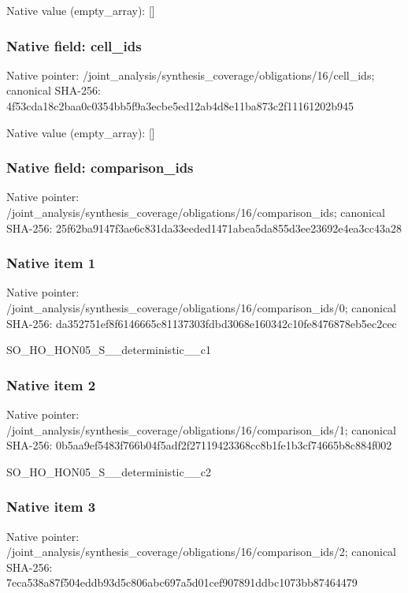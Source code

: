 \documentclass[10pt,a4paper]{article}
\begin{document}
Native value (empty\_\allowbreak{}array): []

\subsubsection{Native field: cell\_\allowbreak{}ids}
Native pointer: /joint\_\allowbreak{}analysis/synthesis\_\allowbreak{}coverage/obligations/16/cell\_\allowbreak{}ids; canonical SHA-256: 4f53cda18c2baa0c0354bb5f9a3ecbe5ed12ab4d8e11ba873c2f11161202b945

Native value (empty\_\allowbreak{}array): []

\subsubsection{Native field: comparison\_\allowbreak{}ids}
Native pointer: /joint\_\allowbreak{}analysis/synthesis\_\allowbreak{}coverage/obligations/16/comparison\_\allowbreak{}ids; canonical SHA-256: 25f62ba9147f3ae6c831da33eeded1471abea5da855d3ee23692e4ea3cc43a28

\subsubsection{Native item 1}
Native pointer: /joint\_\allowbreak{}analysis/synthesis\_\allowbreak{}coverage/obligations/16/comparison\_\allowbreak{}ids/0; canonical SHA-256: da352751ef8f6146665c81137303fdbd3068e160342c10fe8476878eb5ec2cec

\begingroup\raggedright\sloppy SO\_\allowbreak{}HO\_\allowbreak{}HON05\_\allowbreak{}S\_\allowbreak{}\_\allowbreak{}deterministic\_\allowbreak{}\_\allowbreak{}c1\par\endgroup

\subsubsection{Native item 2}
Native pointer: /joint\_\allowbreak{}analysis/synthesis\_\allowbreak{}coverage/obligations/16/comparison\_\allowbreak{}ids/1; canonical SHA-256: 0b5aa9ef5483f766b04f5adf2f27119423368cc8b1fe1b3cf74665b8c884f002

\begingroup\raggedright\sloppy SO\_\allowbreak{}HO\_\allowbreak{}HON05\_\allowbreak{}S\_\allowbreak{}\_\allowbreak{}deterministic\_\allowbreak{}\_\allowbreak{}c2\par\endgroup

\subsubsection{Native item 3}
Native pointer: /joint\_\allowbreak{}analysis/synthesis\_\allowbreak{}coverage/obligations/16/comparison\_\allowbreak{}ids/2; canonical SHA-256: 7eca538a87f504eddb93d5c806abc697a5d01cef907891ddbc1073bb87464479
\end{document}
